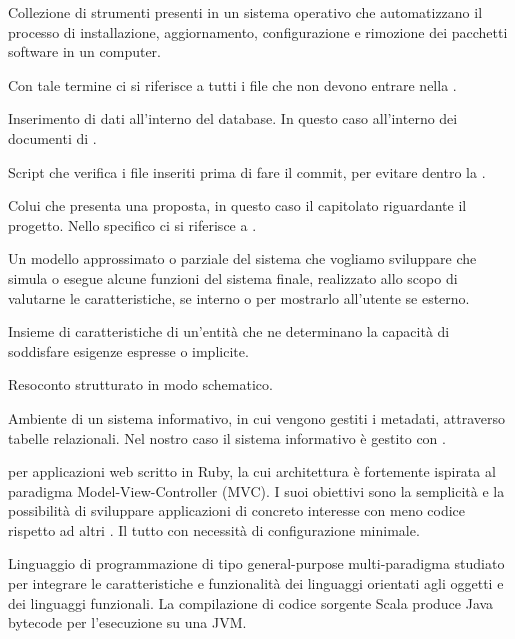 Collezione di strumenti presenti in un sistema operativo che automatizzano il processo di installazione, aggiornamento, configurazione e rimozione dei pacchetti software in un computer.

Con tale termine ci si riferisce a tutti i file che non devono entrare nella .

Inserimento di dati all'interno del database. In questo caso all'interno dei documenti di .

Script che verifica i file inseriti prima di fare il commit, per evitare  dentro la .

Colui che presenta una proposta, in questo caso il capitolato riguardante il progetto.
Nello specifico ci si riferisce a \Proponente{}.

Un modello approssimato o parziale del sistema che vogliamo sviluppare che simula o esegue alcune funzioni del sistema finale, realizzato allo scopo di valutarne le caratteristiche, se interno o per mostrarlo all'utente se esterno.


Insieme di caratteristiche di un'entità che ne determinano la capacità di soddisfare esigenze espresse o implicite.


Resoconto strutturato in modo schematico.

Ambiente di un sistema informativo, in cui vengono gestiti i metadati, attraverso tabelle relazionali.
Nel nostro caso il sistema informativo è gestito con .

  per applicazioni web scritto in Ruby, la cui architettura è fortemente ispirata al paradigma Model-View-Controller (MVC). I suoi obiettivi sono la semplicità e la possibilità di sviluppare applicazioni di concreto interesse con meno codice rispetto ad altri . Il tutto con necessità di configurazione minimale.


Linguaggio di programmazione di tipo general-purpose multi-paradigma studiato per integrare le caratteristiche e funzionalità dei linguaggi orientati agli oggetti e dei linguaggi funzionali. La compilazione di codice sorgente Scala produce Java bytecode per l'esecuzione su una JVM.

